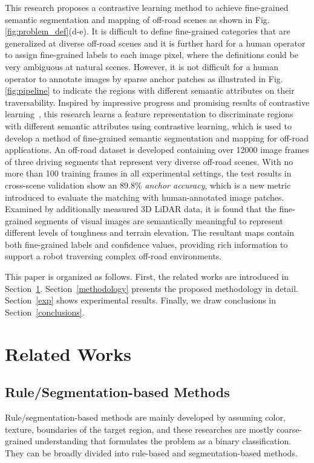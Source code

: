 \documentclass[letterpaper, 10 pt, conference]{ieeeconf}  %
\begin{document}
	This research proposes a contrastive learning method to achieve fine-grained semantic segmentation and mapping of off-road scenes as shown in Fig. \ref{fig:problem_def}(d-e).
	It is difficult to define fine-grained categories that are generalized at diverse off-road scenes and it is further hard for a human operator to assign fine-grained labels to each image pixel, where the definitions could be very ambiguous at natural scenes. However, it is not difficult for a human operator to annotate images by sparse anchor patches as illustrated in Fig. \ref{fig:pipeline} to indicate the regions with different semantic attributes on their traversability. Inspired by impressive progress and promising results of contrastive learning~\cite{oord2018CPC}\cite{chen2020simple}\cite{he2020momentum}, this research learns a feature representation to discriminate regions with different semantic attributes using contrastive learning, which is used to develop a method of fine-grained semantic segmentation and mapping for off-road applications.
	An off-road dataset is developed containing over 12000 image frames of three driving segments that represent very diverse off-road scenes.
	With no more than 100 training frames in all experimental settings, the test results in cross-scene validation show an 89.8\% \textit{anchor accuracy}, which is a new metric introduced to evaluate the matching with human-annotated image patches. 
	Examined by additionally measured 3D LiDAR data, 
	it is found that the fine-grained segments of visual images are semantically meaningful to represent different levels of toughness and terrain elevation.
	The resultant maps contain both fine-grained labels and confidence values, providing rich information to support a robot traversing complex off-road environments.
	
	
	This paper is organized as follows. First, the related works
	are introduced in Section~\ref{related_works}. Section~\ref{methodology} presents the proposed methodology in detail. Section~\ref{exp} shows experimental results. Finally, we draw conclusions in Section~\ref{conclusions}.
	
	\section{Related Works} \label{related_works}
	\subsection{Rule/Segmentation-based Methods}
	Rule/segmentation-based methods are mainly developed by assuming color, texture, boundaries of the target region, and these researches are mostly coarse-grained understanding that formulates the problem as a binary classification. They can be broadly divided into rule-based and segmentation-based methods.
	
\end{document}
